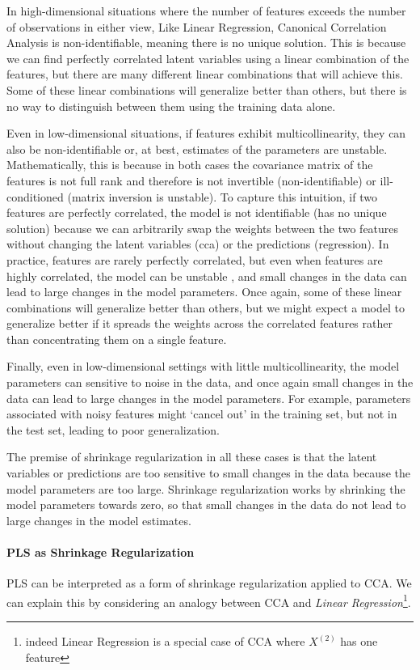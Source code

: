 In high-dimensional situations where the number of features exceeds the number of observations in either view, Like Linear Regression, Canonical Correlation Analysis is non-identifiable, meaning there is no unique solution.
This is because we can find perfectly correlated latent variables using a linear combination of the features, but there are many different linear combinations that will achieve this.
Some of these linear combinations will generalize better than others, but there is no way to distinguish between them using the training data alone.

Even in low-dimensional situations, if features exhibit multicollinearity, they can also be non-identifiable or, at best, estimates of the parameters are unstable.
Mathematically, this is because in both cases the covariance matrix of the features is not full rank and therefore is not invertible (non-identifiable) or ill-conditioned (matrix inversion is unstable).
To capture this intuition, if two features are perfectly correlated, the model is not identifiable (has no unique solution) because we can arbitrarily swap the \gls{weights} between the two features without changing the latent variables (\acrshort{cca}) or the predictions (regression).
In practice, features are rarely perfectly correlated, but even when features are highly correlated, the model can be unstable \citep{mihalik2020multiple}, and small changes in the data can lead to large changes in the model parameters.
Once again, some of these linear combinations will generalize better than others, but we might expect a model to generalize better if it spreads the \gls{weights} across the correlated features rather than concentrating them on a single feature.

Finally, even in low-dimensional settings with little multicollinearity, the model parameters can sensitive to noise in the data, and once again small changes in the data can lead to large changes in the model parameters.
For example, parameters associated with noisy features might `cancel out' in the training set, but not in the test set, leading to poor generalization.

The premise of shrinkage regularization in all these cases is that the latent variables or predictions are too sensitive to small changes in the data because the model parameters are too large.
Shrinkage regularization works by shrinking the model parameters towards zero, so that small changes in the data do not lead to large changes in the model estimates.

\paragraph{PLS as Shrinkage Regularization} PLS can be interpreted as a form of shrinkage regularization applied to CCA. We can explain this by considering an analogy between CCA and \textit{Linear Regression}\footnote{indeed Linear Regression is a special case of CCA where \(X^{(2)}\) has one feature}.


